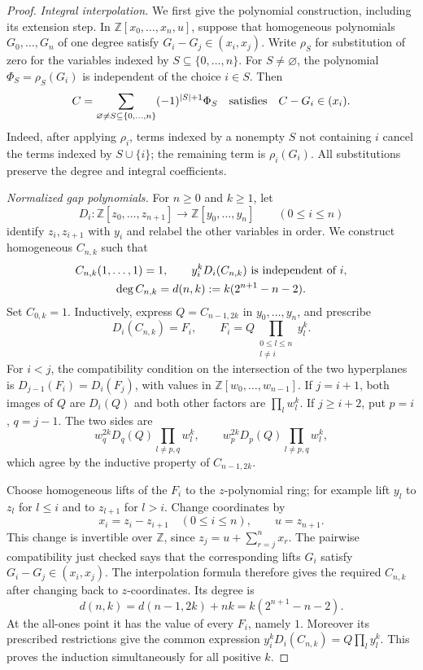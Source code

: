 \documentclass[11pt,a4paper]{article}
\theoremstyle{definition}
\theoremstyle{remark}
\newcommand{\Z}{\mathbb Z}
\begin{document}
\begin{proof}
\emph{Integral interpolation.}
We first give the polynomial construction, including its extension
step.  In $\Z[x_0,\ldots,x_n,u]$, suppose that homogeneous
polynomials $G_0,\ldots,G_n$ of one degree satisfy
$G_i-G_j\in(x_i,x_j)$.  Write $\rho_S$ for substitution of zero for
the variables indexed by $S\subseteq\{0,\ldots,n\}$.
For $S\ne\varnothing$, the polynomial
$\Phi_S=\rho_S(G_i)$ is independent of the choice $i\in S$.
Then
\[
 C=\sum_{\varnothing\ne S\subseteq\{0,\ldots,n\}}
             (-1)^{|S|+1}\Phi_S
 \quad\hbox{satisfies}\quad C-G_i\in(x_i).
\]
Indeed, after applying $\rho_i$, terms indexed by a nonempty
$S$ not containing $i$ cancel the terms indexed by $S\cup\{i\}$;
the remaining term is $\rho_i(G_i)$.  All substitutions preserve
the degree and integral coefficients.

\emph{Normalized gap polynomials.}
For $n\geq0$ and $k\geq1$, let
\[
 D_i:\Z[z_0,\ldots,z_{n+1}]\longrightarrow
          \Z[y_0,\ldots,y_n]\qquad(0\leq i\leq n)
\]
identify $z_i,z_{i+1}$ with $y_i$ and relabel the other variables
in order.  We construct homogeneous $C_{n,k}$ such that
\[
 \begin{gathered}
 C_{n,k}(1,\ldots,1)=1,\qquad
 y_i^kD_i(C_{n,k})\ \hbox{is independent of }i,\\
 \deg C_{n,k}=d(n,k):=k(2^{n+1}-n-2).
 \end{gathered}
\]
Set $C_{0,k}=1$.  Inductively, express $Q=C_{n-1,2k}$ in
$y_0,\ldots,y_n$, and prescribe
\[
 D_i(C_{n,k})=F_i,
 \qquad F_i=Q\prod_{\substack{0\leq l\leq n\\l\ne i}}y_l^k.
\]
For $i<j$, the compatibility condition on the intersection of the
two hyperplanes is
$D_{j-1}(F_i)=D_i(F_j)$, with values in
$\Z[w_0,\ldots,w_{n-1}]$.  If $j=i+1$, both images of $Q$ are
$D_i(Q)$ and both other factors are $\prod_lw_l^k$.
If $j\geq i+2$, put $p=i$, $q=j-1$.  The two sides are
\[
 w_q^{2k}D_q(Q)\prod_{l\ne p,q}w_l^k,
 \qquad
 w_p^{2k}D_p(Q)\prod_{l\ne p,q}w_l^k,
\]
which agree by the inductive property of $C_{n-1,2k}$.

Choose homogeneous lifts of the $F_i$ to the $z$-polynomial ring;
for example lift $y_l$ to $z_l$ for $l\leq i$ and to $z_{l+1}$
for $l>i$.  Change coordinates by
\[
 x_i=z_i-z_{i+1}\quad(0\leq i\leq n),\qquad u=z_{n+1}.
\]
This change is invertible over $\Z$, since
$z_j=u+\sum_{r=j}^{n}x_r$.  The pairwise compatibility just checked
says that the corresponding lifts $G_i$ satisfy
$G_i-G_j\in(x_i,x_j)$.  The interpolation formula therefore gives
the required $C_{n,k}$ after changing back to $z$-coordinates.
Its degree is
\[
 d(n,k)=d(n-1,2k)+nk=k(2^{n+1}-n-2).
\]
At the all-ones point it has the value of every $F_i$, namely $1$.
Moreover its prescribed restrictions give the common expression
$y_i^kD_i(C_{n,k})=Q\prod_l y_l^k$.  This proves the induction
simultaneously for all positive $k$.


\end{proof}
\end{document}
